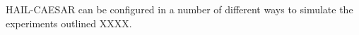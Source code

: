 HAIL-CAESAR can be configured in a number of different ways to simulate the experiments outlined XXXX.

%
%
%
%
%
%
%
%
